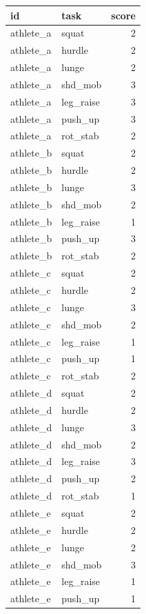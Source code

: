 \documentclass[
]{book}
\begin{document}
\begin{tabular}{l|l|r}
\hline
id & task & score\\
\hline
athlete\_a & squat & 2\\
\hline
athlete\_a & hurdle & 2\\
\hline
athlete\_a & lunge & 2\\
\hline
athlete\_a & shd\_mob & 3\\
\hline
athlete\_a & leg\_raise & 3\\
\hline
athlete\_a & push\_up & 3\\
\hline
athlete\_a & rot\_stab & 2\\
\hline
athlete\_b & squat & 2\\
\hline
athlete\_b & hurdle & 2\\
\hline
athlete\_b & lunge & 3\\
\hline
athlete\_b & shd\_mob & 2\\
\hline
athlete\_b & leg\_raise & 1\\
\hline
athlete\_b & push\_up & 3\\
\hline
athlete\_b & rot\_stab & 2\\
\hline
athlete\_c & squat & 2\\
\hline
athlete\_c & hurdle & 2\\
\hline
athlete\_c & lunge & 3\\
\hline
athlete\_c & shd\_mob & 2\\
\hline
athlete\_c & leg\_raise & 1\\
\hline
athlete\_c & push\_up & 1\\
\hline
athlete\_c & rot\_stab & 2\\
\hline
athlete\_d & squat & 2\\
\hline
athlete\_d & hurdle & 2\\
\hline
athlete\_d & lunge & 3\\
\hline
athlete\_d & shd\_mob & 2\\
\hline
athlete\_d & leg\_raise & 3\\
\hline
athlete\_d & push\_up & 2\\
\hline
athlete\_d & rot\_stab & 1\\
\hline
athlete\_e & squat & 2\\
\hline
athlete\_e & hurdle & 2\\
\hline
athlete\_e & lunge & 2\\
\hline
athlete\_e & shd\_mob & 3\\
\hline
athlete\_e & leg\_raise & 1\\
\hline
athlete\_e & push\_up & 1\\

\end{tabular}
\end{document}
